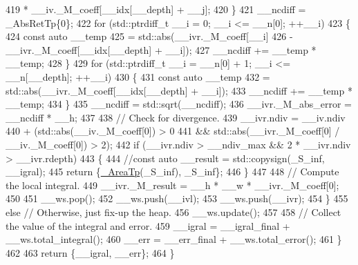 \begin{DoxyCode}
419                          * \_\_iv.\_M\_coeff[\_\_idx[\_\_depth] + \_\_j];
420                 \}
421               \_\_ncdiff = \_AbsRetTp\{0\};
422               \textcolor{keywordflow}{for} (std::ptrdiff\_t \_\_i = 0; \_\_i <= \_\_n[0]; ++\_\_i)
423                 \{
424                   \textcolor{keyword}{const} \textcolor{keyword}{auto} \_\_temp
425                     = std::abs(\_\_ivr.\_M\_coeff[\_\_i]
426                             - \_\_ivr.\_M\_coeff[\_\_idx[\_\_depth] + \_\_i]);
427                   \_\_ncdiff += \_\_temp * \_\_temp;
428                 \}
429               \textcolor{keywordflow}{for} (std::ptrdiff\_t \_\_i = \_\_n[0] + 1; \_\_i <= \_\_n[\_\_depth]; ++\_\_i)
430                 \{
431                   \textcolor{keyword}{const} \textcolor{keyword}{auto} \_\_temp
432                     = std::abs(\_\_ivr.\_M\_coeff[\_\_idx[\_\_depth] + \_\_i]);
433                   \_\_ncdiff += \_\_temp * \_\_temp;
434                 \}
435               \_\_ncdiff = std::sqrt(\_\_ncdiff);
436               \_\_ivr.\_M\_abs\_error = \_\_ncdiff * \_\_h;
437 
438               \textcolor{comment}{// Check for divergence.}
439               \_\_ivr.ndiv = \_\_iv.ndiv
440                          + (std::abs(\_\_iv.\_M\_coeff[0]) > 0
441                          && std::abs(\_\_ivr.\_M\_coeff[0] / \_\_iv.\_M\_coeff[0]) > 2);
442               \textcolor{keywordflow}{if} (\_\_ivr.ndiv > \_\_ndiv\_max && 2 * \_\_ivr.ndiv > \_\_ivr.rdepth)
443                 \{
444                   \textcolor{comment}{//const auto \_\_result = std::copysign(\_S\_inf, \_\_igral);}
445                   \textcolor{keywordflow}{return} \{\hyperlink{namespace____gnu__cxx_ae97a51b75e19c30f48d27fac4664de6e}{\_AreaTp}(\_S\_inf), \_S\_inf\};
446                 \}
447 
448               \textcolor{comment}{// Compute the local integral.}
449               \_\_ivr.\_M\_result = \_\_h * \_\_w * \_\_ivr.\_M\_coeff[0];
450 
451               \_\_ws.pop();
452               \_\_ws.push(\_\_ivl);
453               \_\_ws.push(\_\_ivr);
454             \}
455           \textcolor{keywordflow}{else} \textcolor{comment}{// Otherwise, just fix-up the heap.}
456             \_\_ws.update();
457 
458           \textcolor{comment}{// Collect the value of the integral and error.}
459           \_\_igral = \_\_igral\_final + \_\_ws.total\_integral();
460           \_\_err = \_\_err\_final + \_\_ws.total\_error();
461         \}
462 
463       \textcolor{keywordflow}{return} \{\_\_igral, \_\_err\};
464     \}
\end{DoxyCode}
\mbox{\label{namespace____gnu__cxx_a3a0de8d324d776aa6b7f631559da4d7c}} 
